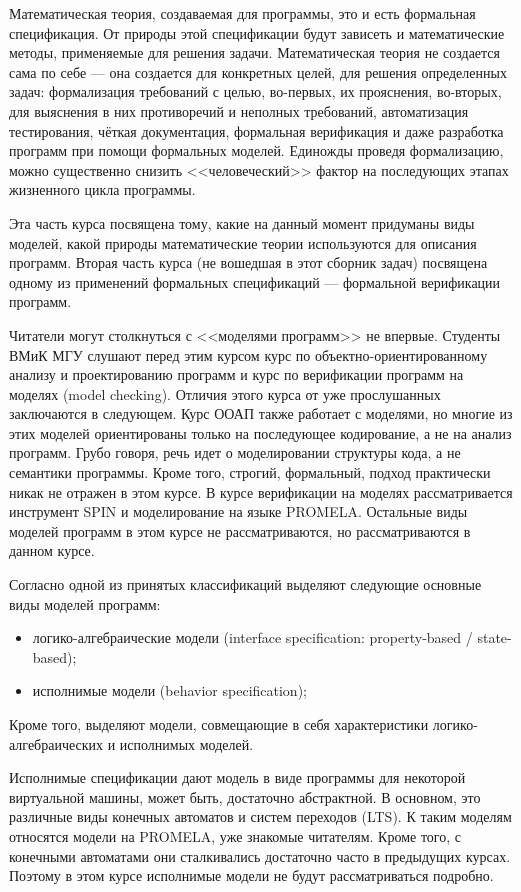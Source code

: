 \documentclass[14pt, twoside]{extreport}
\begin{document}
Математическая теория, создаваемая для программы, это и есть формальная спецификация. От природы этой спецификации будут зависеть и математические методы, применяемые для решения задачи. Математическая теория не создается сама по себе --- она создается для конкретных целей, для решения определенных задач: формализация требований с целью, во-первых, их прояснения, во-вторых, для выяснения в них противоречий и неполных требований, автоматизация тестирования, чёткая документация, формальная верификация и даже разработка программ при помощи формальных моделей. Единожды проведя формализацию, можно существенно снизить <<человеческий>> фактор на последующих этапах жизненного цикла программы.

Эта часть курса посвящена тому, какие на данный момент придуманы виды моделей, какой природы математические теории используются для описания программ. Вторая часть курса (не вошедшая в этот сборник задач) посвящена одному из применений формальных спецификаций --- формальной верификации программ.

Читатели могут столкнуться с <<моделями программ>> не впервые. Студенты ВМиК МГУ слушают перед этим курсом курс по объектно-ориентированному анализу и проектированию программ и курс по верификации программ на моделях (model checking). Отличия этого курса от уже прослушанных заключаются в следующем. Курс ООАП также работает с моделями, но многие из этих моделей ориентированы только на последующее кодирование, а не на анализ программ. Грубо говоря, речь идет о моделировании структуры кода, а не семантики программы. Кроме того, строгий, формальный, подход практически никак не отражен в этом курсе. В курсе верификации на моделях рассматривается инструмент SPIN и моделирование на языке PROMELA. Остальные виды моделей программ в этом курсе не рассматриваются, но рассматриваются в данном курсе.

Согласно одной из принятых классификаций выделяют следующие основные виды моделей программ:
\begin{itemize}
  \item логико-алгебраические модели (interface specification: property-based / state-based);
  \item исполнимые модели (behavior specification);
\end{itemize}
Кроме того, выделяют модели, совмещающие в себя характеристики логико-алгебраических и исполнимых моделей.

Исполнимые спецификации дают модель в виде программы для некоторой виртуальной машины, может быть, достаточно абстрактной. В основном, это различные виды конечных автоматов и систем переходов (LTS). К таким моделям относятся модели на PROMELA, уже знакомые читателям. Кроме того, с конечными автоматами они сталкивались достаточно часто в предыдущих курсах. Поэтому в этом курсе исполнимые модели не будут рассматриваться подробно.
\end{document}
